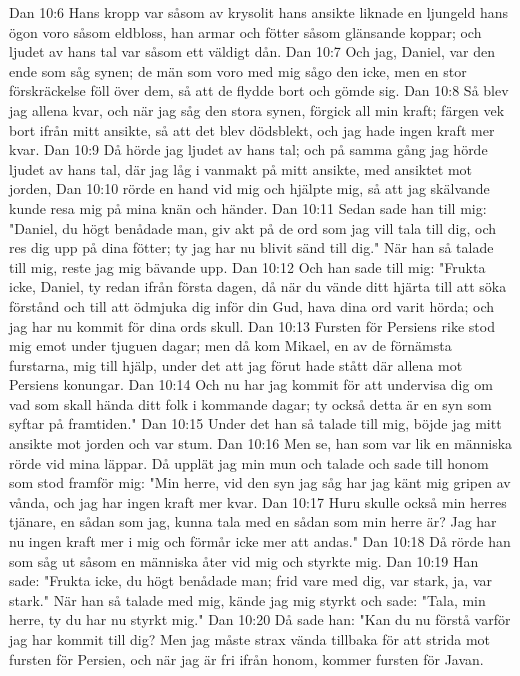 Dan 10:6  Hans kropp var såsom av krysolit hans ansikte liknade en ljungeld hans ögon voro såsom eldbloss, han armar och fötter såsom glänsande koppar; och ljudet av hans tal var såsom ett väldigt dån.
Dan 10:7  Och jag, Daniel, var den ende som såg synen; de män som voro med mig sågo den icke, men en stor förskräckelse föll över dem, så att de flydde bort och gömde sig.
Dan 10:8  Så blev jag allena kvar, och när jag såg den stora synen, förgick all min kraft; färgen vek bort ifrån mitt ansikte, så att det blev dödsblekt, och jag hade ingen kraft mer kvar.
Dan 10:9  Då hörde jag ljudet av hans tal; och på samma gång jag hörde ljudet av hans tal, där jag låg i vanmakt på mitt ansikte, med ansiktet mot jorden,
Dan 10:10  rörde en hand vid mig och hjälpte mig, så att jag skälvande kunde resa mig på mina knän och händer.
Dan 10:11  Sedan sade han till mig: "Daniel, du högt benådade man, giv akt på de ord som jag vill tala till dig, och res dig upp på dina fötter; ty jag har nu blivit sänd till dig." När han så talade till mig, reste jag mig bävande upp.
Dan 10:12  Och han sade till mig: "Frukta icke, Daniel, ty redan ifrån första dagen, då när du vände ditt hjärta till att söka förstånd och till att ödmjuka dig inför din Gud, hava dina ord varit hörda; och jag har nu kommit för dina ords skull.
Dan 10:13  Fursten för Persiens rike stod mig emot under tjuguen dagar; men då kom Mikael, en av de förnämsta furstarna, mig till hjälp, under det att jag förut hade stått där allena mot Persiens konungar.
Dan 10:14  Och nu har jag kommit för att undervisa dig om vad som skall hända ditt folk i kommande dagar; ty också detta är en syn som syftar på framtiden."
Dan 10:15  Under det han så talade till mig, böjde jag mitt ansikte mot jorden och var stum.
Dan 10:16  Men se, han som var lik en människa rörde vid mina läppar. Då upplät jag min mun och talade och sade till honom som stod framför mig: "Min herre, vid den syn jag såg har jag känt mig gripen av vånda, och jag har ingen kraft mer kvar.
Dan 10:17  Huru skulle också min herres tjänare, en sådan som jag, kunna tala med en sådan som min herre är? Jag har nu ingen kraft mer i mig och förmår icke mer att andas."
Dan 10:18  Då rörde han som såg ut såsom en människa åter vid mig och styrkte mig.
Dan 10:19  Han sade: "Frukta icke, du högt benådade man; frid vare med dig, var stark, ja, var stark." När han så talade med mig, kände jag mig styrkt och sade: "Tala, min herre, ty du har nu styrkt mig."
Dan 10:20  Då sade han: "Kan du nu förstå varför jag har kommit till dig? Men jag måste strax vända tillbaka för att strida mot fursten för Persien, och när jag är fri ifrån honom, kommer fursten för Javan.

